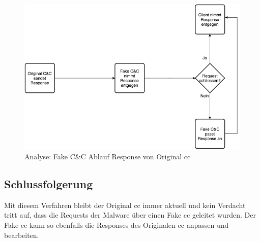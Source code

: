 \begin{figure}[H]
	\centering
	\includegraphics[width=\textwidth]{img/FakeCC-Response}
	\caption{Analyse: Fake C\&C Ablauf Response von Original \gls{cc}}
	\label{fig:fakecc-response}
\end{figure}

\subsection{Schlussfolgerung}
Mit diesem Verfahren bleibt der Original \gls{cc} immer aktuell und kein Verdacht tritt auf, dass die Requests der Malware über einen Fake \gls{cc} geleitet wurden.
Der Fake \gls{cc} kann so ebenfalls die Responses des Originalen \gls{cc} anpassen und bearbeiten.




